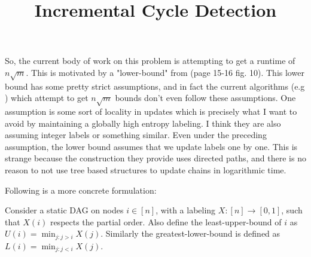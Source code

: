 \documentclass[11pt]{article}
\title{Incremental Cycle Detection}
\date{}
\author{}
\begin{document}
\maketitle
\thispagestyle{empty}
\setcounter{page}{0}

So, the current body of work on this problem is attempting to get a runtime of $n\sqrt m$.
This is motivated by a "lower-bound" from \cite{lower_bound}(page 15-16 fig. 10).
This lower bound has some pretty strict assumptions, and in fact the current algorithms (e.g \cite{example})
which attempt to get $n\sqrt m$ bounds don't even follow these assumptions.
One assumption is some sort of locality in updates which is precisely what I want to avoid by maintaining a globally high entropy labeling.
I think they are also assuming integer labels or something similar.
Even under the preceding assumption, the lower bound assumes that we update labels one by one.
This is strange because the construction they provide uses directed paths,
and there is no reason to not use tree based structures to update chains in logarithmic time.

Following is a more concrete formulation:

Consider a static DAG on nodes $i\in [n]$, with a labeling $X : [n] \rightarrow [0,1]$, such that $X(i)$ respects the partial order.
Also define the least-upper-bound of $i$ as $U(i) = \min_{j : j>i }{X(j)}$. Similarly the greatest-lower-bound is defined as $L(i) = \min_{j : j < i }{X(j)}$.
\end{document}
